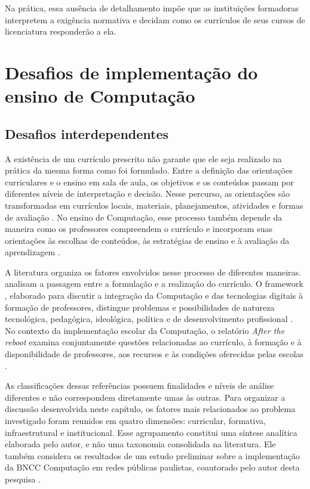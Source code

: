 Na prática, essa ausência de detalhamento impõe que as instituições formadoras interpretem a exigência normativa e decidam como os currículos de seus cursos de licenciatura responderão a ela.

\section{Desafios de implementação do ensino de Computação}

\subsection{Desafios interdependentes}
\label{subsec:desafios-interdependentes}

A existência de um currículo prescrito não garante que ele seja realizado na prática da mesma forma como foi formulado. Entre a definição das orientações curriculares e o ensino em sala de aula, os objetivos e os conteúdos passam por diferentes níveis de interpretação e decisão. Nesse percurso, as orientações são transformadas em currículos locais, materiais, planejamentos, atividades e formas de avaliação \cite{remillard2014conceptualizing}. No ensino de Computação, esse processo também depende da maneira como os professores compreendem o currículo e incorporam suas orientações às escolhas de conteúdos, às estratégias de ensino e à avaliação da aprendizagem \cite{yiatas2026enacting}.

A literatura organiza os fatores envolvidos nesse processo de diferentes maneiras.  analisam a passagem entre a formulação e a realização do currículo. O framework , elaborado para discutir a integração da Computação e das tecnologias digitais à formação de professores, distingue problemas e possibilidades de natureza tecnológica, pedagógica, ideológica, política e de desenvolvimento profissional \cite{vogel2024encite}. No contexto da implementação escolar da Computação, o relatório \textit{After the reboot} examina conjuntamente questões relacionadas ao currículo, à formação e à disponibilidade de professores, aos recursos e às condições oferecidas pelas escolas \cite{royal2017afterreboot}.

As classificações dessas referências possuem finalidades e níveis de análise diferentes e não correspondem diretamente umas às outras. Para organizar a discussão desenvolvida neste capítulo, os fatores mais relacionados ao problema investigado foram reunidos em quatro dimensões: curricular, formativa, infraestrutural e institucional. Esse agrupamento constitui uma síntese analítica elaborada pelo autor, e não uma taxonomia consolidada na literatura. Ele também considera os resultados de um estudo preliminar sobre a implementação da BNCC Computação em redes públicas paulistas, coautorado pelo autor desta pesquisa \cite{santana2026desafios}.

